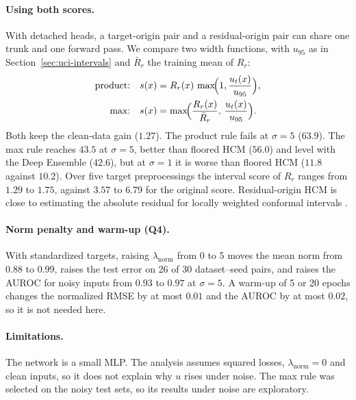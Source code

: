 \paragraph{Using both scores.} With detached heads, a target-origin pair and a
residual-origin pair can share one trunk and one forward pass. We compare two width functions, with $u_{95}$ as in
Section~\ref{sec:uci-intervals} and $\bar R_r$ the training mean of $R_r$:
\begin{align*}
\text{product:}\quad s(x) &= R_r(x)\,\max\!\Bigl(1,\frac{u_t(x)}{u_{95}}\Bigr),\\
\text{max:}\quad s(x) &= \max\!\Bigl(\frac{R_r(x)}{\bar R_r},\,\frac{u_t(x)}{u_{95}}\Bigr).
\end{align*}
Both keep the clean-data gain ($1.27$). The product rule fails at $\sigma=5$ ($63.9$). The
max rule reaches $43.5$ at $\sigma=5$, better than floored HCM ($56.0$) and level with the
Deep Ensemble ($42.6$), but at $\sigma=1$ it is worse than floored HCM ($11.8$ against
$10.2$). Over five target preprocessings the interval score of $R_r$ ranges from $1.29$ to
$1.75$, against $3.57$ to $6.79$ for the original score. Residual-origin HCM is close to estimating the absolute residual for locally weighted
conformal intervals \citep{lei2018conformal}.

\paragraph{Norm penalty and warm-up (Q4).} With standardized targets, raising
$\lambda_{\text{norm}}$ from 0 to 5 moves the mean norm from $0.88$ to $0.99$, raises the
test error on 26 of 30 dataset--seed pairs, and raises the AUROC for noisy inputs from
$0.93$ to $0.97$ at $\sigma=5$. A warm-up of 5 or 20 epochs changes the normalized RMSE by
at most $0.01$ and the AUROC by at most $0.02$, so it is not needed here.

\paragraph{Limitations.}
\label{sec:uci-limits}
The network is a small MLP. The analysis assumes squared losses,
$\lambda_{\text{norm}}=0$ and clean inputs, so it does not explain why $u$ rises under
noise. The max rule was selected on the noisy test sets, so its results under noise are exploratory.
